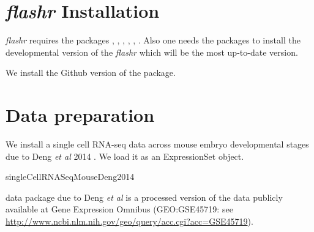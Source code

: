 \documentclass[12pt]{article}
\newcommand{\flashr}{\textit{flashr}}
\begin{document}
\section{\flashr{} Installation}

\flashr{} requires the packages , , , , , . Also one needs the packages to install the developmental version of the \flashr{} which will be the most up-to-date version.

We install the Github version of the package.

\begin{knitrout}
\color{fgcolor}\begin{kframe}
\begin{alltt}
\hlopt{::}\hlstd{(}\hlstd{)}
\end{alltt}
\end{kframe}
\end{knitrout}

\begin{knitrout}
\color{fgcolor}\begin{kframe}
\begin{alltt}
\end{alltt}
\end{kframe}
\end{knitrout}

\section{Data preparation}

We install a single cell RNA-seq data across mouse embryo developmental stages due to Deng \textit{et al} 2014 \cite{Deng2014}. We load it as an ExpressionSet object.\begin{verb} singleCellRNASeqMouseDeng2014 \end{verb} data package due to Deng \textit{et al} is a processed version of the data publicly available at Gene Expression Omnibus (GEO:GSE45719: see \url{http://www.ncbi.nlm.nih.gov/geo/query/acc.cgi?acc=GSE45719}).
\end{document}
